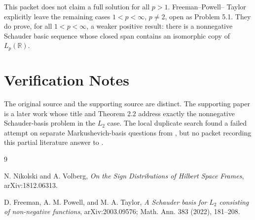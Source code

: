 \documentclass[11pt]{article}
\begin{document}
This packet does not claim a full solution for all \(p>1\).  Freeman--Powell--
Taylor explicitly leave the remaining cases \(1<p<\infty\), \(p\neq 2\), open
as Problem 5.1.  They do prove, for all \(1<p<\infty\), a weaker positive result:
there is a nonnegative Schauder basic sequence whose closed span contains an
isomorphic copy of \(L_p(\mathbb R)\).

\section*{Verification Notes}

The original source and the supporting source are distinct.  The supporting
paper is a later work whose title and Theorem 2.2 address exactly the
nonnegative Schauder-basis problem in the \(L_2\) case.  The local duplicate
search found a failed attempt on separate Markushevich-basis questions from
\cite{FPT}, but no packet recording this partial literature answer to
\cite{NV}.

\begin{thebibliography}{9}

N. Nikolski and A. Volberg,
\emph{On the Sign Distributions of Hilbert Space Frames},
arXiv:1812.06313.

D. Freeman, A. M. Powell, and M. A. Taylor,
\emph{A Schauder basis for \(L_2\) consisting of non-negative functions},
arXiv:2003.09576; Math. Ann. 383 (2022), 181--208.

\end{thebibliography}
\end{document}
